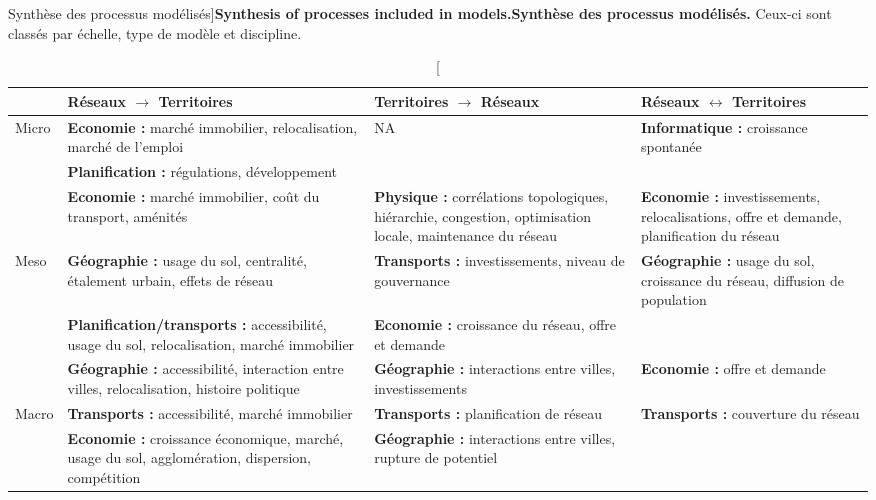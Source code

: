 \begin{table}%
\caption[Synthesis of processes included in models][Synthèse des processus modélisés]{\textbf{Synthesis of processes included in models.}\label{tab:modelography:processes}}{\textbf{Synthèse des processus modélisés.} Ceux-ci sont classés par échelle, type de modèle et discipline. \label{tab:modelography:processes}}
\begin{tabular}{|l|p{5.5cm}|p{5.5cm}|p{5.5cm}|}
\hline
 & Réseaux $\rightarrow$ Territoires & Territoires $\rightarrow$ Réseaux & Réseaux $\leftrightarrow$ Territoires\\ \hline
\multirow{2}{*}{Micro} &
\textbf{Economie : } marché immobilier, relocalisation, marché de l'emploi & NA & \textbf{Informatique : } croissance spontanée \\\cline{2-2}
& \textbf{Planification : } régulations, développement & & \\\hline
& \textbf{Economie : } marché immobilier, coût du transport, aménités & \textbf{Physique : } corrélations topologiques, hiérarchie, congestion, optimisation locale, maintenance du réseau & \textbf{Economie : } investissements, relocalisations, offre et demande, planification du réseau\\\cline{2-4}
\multirow{2}{*}{Meso}& \textbf{Géographie : } usage du sol, centralité, étalement urbain, effets de réseau & \textbf{Transports : } investissements, niveau de gouvernance & \textbf{Géographie : } usage du sol, croissance du réseau, diffusion de population \\\cline{2-4}
& \textbf{Planification/transports : } accessibilité, usage du sol, relocalisation, marché immobilier & \textbf{Economie : } croissance du réseau, offre et demande & \\\hline
& \textbf{Géographie : } accessibilité, interaction entre villes, relocalisation, histoire politique  & \textbf{Géographie : } interactions entre villes, investissements & \textbf{Economie : } offre et demande \\ \cline{2-4}
\multirow{2}{*}{Macro} & \textbf{Transports : } accessibilité, marché immobilier & \textbf{Transports : } planification de réseau & \textbf{Transports : } couverture du réseau \\\cline{2-3}\cline{4-4}
& \textbf{Economie : } croissance économique, marché, usage du sol, agglomération, dispersion, compétition & \textbf{Géographie : } interactions entre villes, rupture de potentiel & \\\hline
\end{tabular}
\end{table}

